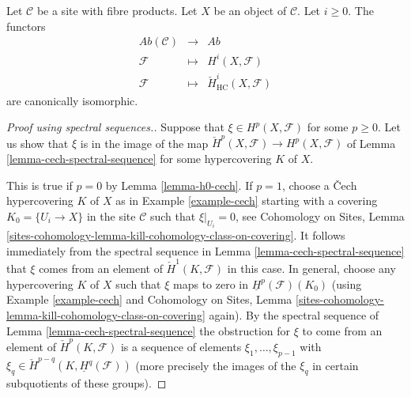 \begin{theorem}
\label{theorem-cohomology-hypercoverings}
Let $\mathcal{C}$ be a site with fibre products.
Let $X$ be an object of $\mathcal{C}$. Let $i \geq 0$.
The functors
\begin{eqnarray*}
\textit{Ab}(\mathcal{C}) & \longrightarrow & \textit{Ab} \\
\mathcal{F} & \longmapsto & H^i(X, \mathcal{F}) \\
\mathcal{F} & \longmapsto & \check{H}^i_{\text{HC}}(X, \mathcal{F})
\end{eqnarray*}
are canonically isomorphic.
\end{theorem}

\begin{proof}[Proof using spectral sequences.]
Suppose that $\xi \in H^p(X, \mathcal{F})$ for some $p \geq 0$.
Let us show that $\xi$ is in the image of the map
$\check{H}^p(X, \mathcal{F}) \to H^p(X, \mathcal{F})$ of
Lemma \ref{lemma-cech-spectral-sequence}
for some hypercovering $K$ of $X$.

\medskip\noindent
This is true if $p = 0$ by Lemma \ref{lemma-h0-cech}.
If $p = 1$, choose a {\v C}ech hypercovering $K$ of $X$ as in
Example \ref{example-cech} starting with a covering
$K_0 = \{U_i \to X\}$ in the site $\mathcal{C}$ such that
$\xi|_{U_i} = 0$, see
Cohomology on Sites,
Lemma \ref{sites-cohomology-lemma-kill-cohomology-class-on-covering}.
It follows immediately from the spectral sequence
in Lemma \ref{lemma-cech-spectral-sequence} that $\xi$ comes
from an element of $\check{H}^1(K, \mathcal{F})$ in this case.
In general, choose any hypercovering $K$ of $X$ such
that $\xi$ maps to zero in $\underline{H}^p(\mathcal{F})(K_0)$
(using Example \ref{example-cech} and
Cohomology on Sites,
Lemma \ref{sites-cohomology-lemma-kill-cohomology-class-on-covering}
again).
By the spectral sequence of Lemma \ref{lemma-cech-spectral-sequence}
the obstruction for $\xi$ to come from an element of
$\check{H}^p(K, \mathcal{F})$ is a sequence of elements
$\xi_1, \ldots, \xi_{p - 1}$ with
$\xi_q \in \check{H}^{p - q}(K, \underline{H}^q(\mathcal{F}))$
(more precisely the images of the $\xi_q$ in certain subquotients
of these groups).


\end{proof}
